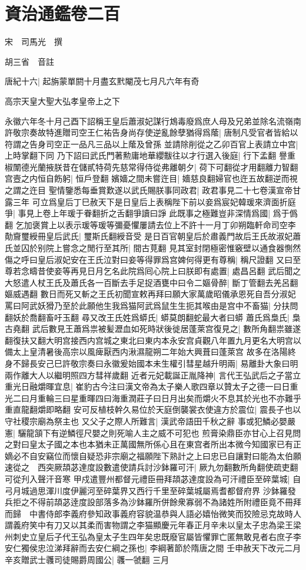\chapter{資治通鑑卷二百}
宋　司馬光　撰

胡三省　音註

唐紀十六|{
	起旃蒙單閼十月盡玄黓閹茂七月凡六年有奇}


高宗天皇大聖大弘孝皇帝上之下

永徽六年冬十月己酉下詔稱王皇后蕭淑妃謀行鴆毒廢爲庶人母及兄弟並除名流嶺南許敬宗奏故特進贈司空王仁祐告身尚存使逆亂餘孽猶得爲䕃|{
	唐制凡受官者皆給以符謂之告身司空正一品凡三品以上䕃及曾孫}
並請除削從之乙卯百官上表請立中宫|{
	上時掌翻下同}
乃下詔曰武氏門著勲庸地華纓黻往以才行選入後庭|{
	行下孟翻}
譽重椒闈德光蘭掖朕昔在儲貳特荷先慈常得侍從弗離朝夕|{
	荷下可翻從才用翻離力智翻}
宫壼之内恒自飭躬|{
	恒戶登翻}
嬪嬙之間未嘗迕目|{
	嬙慈良翻婦官也迕五故翻逆而視之謂之迕目}
聖情鑒悉每垂賞歎遂以武氏賜朕事同政君|{
	政君事見二十七卷漢宣帝甘露三年}
可立爲皇后丁巳赦天下是日皇后上表稱陛下前以妾爲宸妃韓瑗來濟面折庭爭|{
	事見上卷上年瑗于眷翻折之舌翻爭讀曰諍}
此既事之極難豈非深情爲國|{
	爲于僞翻}
乞加褒賞上以表示瑗等瑗等彌憂懼屢請去位上不許十一月丁卯朔臨軒命司空李勣齎璽綬冊皇后武氏|{
	璽斯氏翻綬音受}
是日百官朝皇后於肅義門故后王氏故淑妃蕭氏並囚於别院上嘗念之閒行至其所|{
	間古莧翻}
見其室封閉極密惟竅壁以通食器惻然傷之呼曰皇后淑妃安在王氏泣對曰妾等得罪爲宫婢何得更有尊稱|{
	稱尺證翻}
又曰至尊若念疇昔使妾等再見日月乞名此院爲囘心院上曰朕即有處置|{
	處昌呂翻}
武后聞之大怒遣人杖王氏及蕭氏各一百斷去手足捉酒甕中曰令二嫗骨醉|{
	斷丁管翻去羌呂翻嫗威遇翻}
數日而死又斬之王氏初聞宣敕再拜曰願大家萬歲昭儀承恩死自吾分淑妃罵曰阿武妖猾乃至於此願他生我爲猫阿武爲鼠生生扼其喉由是宫中不畜猫|{
	分扶問翻妖於喬翻畜吁玉翻}
尋又改王氏姓爲蟒氏|{
	蟒莫朗翻蛇最大者曰蟒}
蕭氏爲梟氏|{
	梟古堯翻}
武后數見王蕭爲祟被髪瀝血如死時狀後徙居蓬萊宫復見之|{
	數所角翻祟雖遂翻復扶又翻大明宫接西内宫城之東北曰東内本永安宫貞觀八年置九月更名大明宫以備太上皇清暑後高宗以風痺厭西内湫濕龍朔二年始大興葺曰蓬萊宫}
故多在洛陽終身不歸長安己巳許敬宗奏曰永徽爰始國本未生權引彗星越升明兩|{
	易離卦大象曰明兩作離大人以繼明照四方彗祥歲翻}
近者元妃載誕正胤降神|{
	言代王弘武后之子當立}
重光日融爝暉宜息|{
	崔豹古今注曰漢文帝為太子樂人歌四章以贊太子之德一曰日重光二曰月重輪三曰星重暉四曰海重潤莊子曰日月出矣而爝火不息其於光也不亦難乎重直龍翻爝即略翻}
安可反植枝幹久易位於天庭倒襲裳衣使違方於震位|{
	震長子也以守社稷宗廟為祭主也}
又父子之際人所難言|{
	漢武帝語田千秋之辭}
事或犯鱗必嬰嚴憲|{
	驪龍頷下有逆鱗徑尺嬰之則死喻人主之威不可犯也}
煎膏染鼎臣亦甘心上召見問之對曰皇太子國之本也本猶未正萬國無所係心且在東宫者所出本微今知國家已有正嫡必不自安竊位而懷自疑恐非宗廟之福願陛下熟計之上曰忠已自讓對曰能為太伯願速從之　西突厥頡苾達度設數遣使請兵討沙鉢羅可汗|{
	厥九勿翻數所角翻使疏吏翻可從刋入聲汗音寒}
甲戍遣豐州都督元禮臣冊拜頡苾達度設為可汗禮臣至碎葉城|{
	自弓月城過思渾川度伊麗河至碎葉界又西行千里至碎葉城屬焉耆都督府界}
沙鉢羅發兵拒之不得前頡苾逹度設部落多為沙鉢羅所併餘衆寡弱不為諸姓所附禮臣竟不冊拜而歸　中書侍郎李義府參知政事義府容貌温恭與人語必嬉怡微笑而狡險忌克故時人謂義府笑中有刀又以其柔而害物謂之李猫顯慶元年春正月辛未以皇太子忠為梁王梁州刺史立皇后子代王弘為皇太子生四年矣忠既廢官屬皆懼罪亡匿無敢見者右庶子李安仁獨侯忠泣涕拜辭而去安仁綱之孫也|{
	李綱著節於隋唐之間}
壬申赦天下改元二月辛亥贈武士彠司徒賜爵周國公|{
	彠一虢翻}
三月

